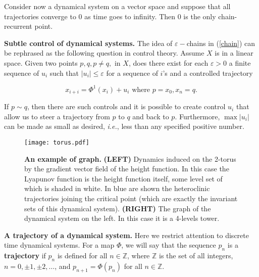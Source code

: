 \documentclass{article}
\def\gr{}
\newcommand{\bigletter}[1]{\mathlarger{\mathlarger{#1}}}
\newcommand{\bigO}{\bigletter{N}}
\newcommand{\allblack}{\color{black}{}}
\newcommand{\ie}{{\it{i.e.}}}
\newcommand{\beq}{\begin{linenomath}\begin{equation}} %
\newcommand{\eeq}{\end{equation}\end{linenomath}} %
\def\bZ{\mathbb{Z}}
\begin{document}
Consider now a dynamical system on a vector space and suppose that all trajectories converge to 0 as time goes to infinity. Then 0 is the only chain-recurrent point. 



{\bf Subtle control of dynamical systems.} The idea of $\varepsilon-$chains in (\ref{chain}) can be rephrased as the following question in control theory. Assume $X$ is in a linear space.
Given two points $p,q,p\ne q,$ in $X$, does there exist for each 
$\varepsilon>0$ a finite sequence of $u_i$ such that
$|u_i|\le\varepsilon$ for a sequence of $i$'s
and a controlled trajectory
%
\beq
x_{i+i}=\Phi^{1}(x_i)+u_i \mbox{ where }p=x_0,x_n=q.
\label{control}
\eeq
%
If $p\sim q$, then there are such controls and it is possible to create control $u_i$ that allow us to steer a trajectory from $p$ to $q$ and back to $p$. Furthermore, $\max|u_i|$ can be made as small as desired, \ie, less than any specified positive number.

\allblack


    
\begin{figure}
 \centering
 \texttt{[image: torus.pdf]} 
 \caption{{\bf An example of \gr graph.} {\bf (LEFT)} Dynamics induced on the 2-torus by the gradient vector field of the height function. In this case the Lyapunov function is the height function itself, some level set of which is shaded in white. In blue are shown the heteroclinic trajectories joining the critical point (which are exactly the invariant sets of this dynamical system). {\bf (RIGHT)} The \gr graph of the dynamical system on the left. In this case it is a 4-levels tower.
 }
 \label{fig:pp}
\end{figure}
  
{\bf A trajectory of a dynamical system.}
Here we restrict attention to discrete time dynamical systems. For a map $\Phi$,
we will say that the sequence $p_n$ is a {\bf trajectory} if
 $p_n$ is defined for all $n\in\bZ$,
where $\bZ$ is the set of all integers, $n=0,\pm1,\pm2,\ldots$, and 
$p_{n+1}= \Phi(p_n)$ for all $n\in \bZ$.
\end{document}

